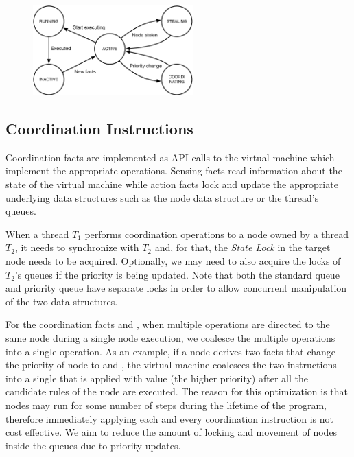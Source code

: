 \begin{figure}[ht]
   \centering
   \includegraphics[width=0.55\textwidth]{figures/implementation/node_states.pdf}
   \label{fig:implementation:node_states}
\end{figure}

\subsection{Coordination Instructions}\label{section:coordination:coord_instrs}

Coordination facts are implemented as API calls to the virtual machine which
implement the appropriate operations. Sensing facts read information about the
state of the virtual machine while action facts lock and update the appropriate
underlying data structures such as the node data structure or the thread's
queues.

When a thread $T_1$ performs coordination operations to a node owned by a thread
$T_2$, it needs to synchronize with $T_2$ and, for that, the \emph{State Lock} in
the target node needs to be acquired. Optionally, we may need to also acquire the
locks of $T_2$'s queues if the priority is being updated. Note that both the standard
queue and priority queue have separate locks in order to allow concurrent
manipulation of the two data structures.

For the coordination facts  and , when
multiple operations are directed to the same node during a single node
execution, we coalesce the multiple operations into a single operation.  As an
example, if a node derives two  facts that change the
priority of node  to  and , the virtual machine
coalesces the two instructions into a single  that is applied
with value  (the higher priority) after all the candidate rules of the
node are executed. The reason for this optimization is that nodes may run for
some number of steps during the lifetime of the program, therefore immediately
applying each and every coordination instruction is not cost effective. We aim
to reduce the amount of locking and movement of nodes inside the queues due to
priority updates.
